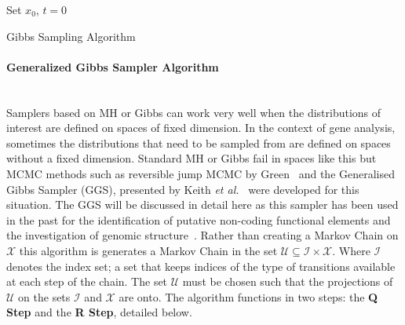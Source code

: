 \begin{algorithm}[H]
 Set $x_0$, $t=0$\; 
  \caption{Gibbs Sampling Algorithm}
\end{algorithm}

	\paragraph{Generalized Gibbs Sampler Algorithm}~\\
\noindent
Samplers based on MH or Gibbs can work very well when the distributions of interest are defined on spaces of fixed dimension. In the context of gene analysis, sometimes the distributions that need to be sampled from are defined on spaces without a fixed dimension. Standard MH or Gibbs fail in spaces like this but MCMC methods such as reversible jump MCMC by Green~\cite{green1995reversible} and the Generalised Gibbs Sampler (GGS), presented by Keith \emph{et al.}~\cite{keith2004generalized} were developed for this situation. The GGS will be discussed in detail here as this sampler has been used in the past for the identification of putative non-coding functional elements and the investigation of genomic structure~\cite{algama2014drosophila}.%
Rather than creating a Markov Chain on ${\mathscr X}$ this algorithm is generates a Markov Chain in the set $\mathscr U \subseteq \mathscr I \times \mathscr X$. Where $\mathscr I$ denotes the index set; a set that keeps indices of the type of transitions available at each step of the chain. The set $\mathscr U$ must be chosen such that the projections of $\mathscr U$ on the sets $\mathscr I$ and $\mathscr X$ are onto. The algorithm functions in two steps: the \textbf{Q Step} and the \textbf{R Step}, detailed below. 

